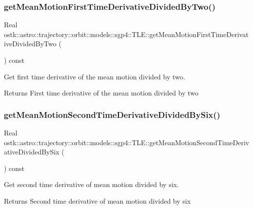 \subsubsection{\texorpdfstring{get\+Mean\+Motion\+First\+Time\+Derivative\+Divided\+By\+Two()}{getMeanMotionFirstTimeDerivativeDividedByTwo()}}
{\footnotesize\ttfamily Real ostk\+::astro\+::trajectory\+::orbit\+::models\+::sgp4\+::\+T\+L\+E\+::get\+Mean\+Motion\+First\+Time\+Derivative\+Divided\+By\+Two (\begin{DoxyParamCaption}{ }\end{DoxyParamCaption}) const}



Get first time derivative of the mean motion divided by two. 

\begin{DoxyReturn}{Returns}
First time derivative of the mean motion divided by two 
\end{DoxyReturn}
\mbox{\label{classostk_1_1astro_1_1trajectory_1_1orbit_1_1models_1_1sgp4_1_1_t_l_e_a7115d973dfff075411e114542bec8eeb}} 
\subsubsection{\texorpdfstring{get\+Mean\+Motion\+Second\+Time\+Derivative\+Divided\+By\+Six()}{getMeanMotionSecondTimeDerivativeDividedBySix()}}
{\footnotesize\ttfamily Real ostk\+::astro\+::trajectory\+::orbit\+::models\+::sgp4\+::\+T\+L\+E\+::get\+Mean\+Motion\+Second\+Time\+Derivative\+Divided\+By\+Six (\begin{DoxyParamCaption}{ }\end{DoxyParamCaption}) const}



Get second time derivative of mean motion divided by six. 

\begin{DoxyReturn}{Returns}
Second time derivative of mean motion divided by six 
\end{DoxyReturn}
\mbox{\label{classostk_1_1astro_1_1trajectory_1_1orbit_1_1models_1_1sgp4_1_1_t_l_e_af8a8a71621c85e1a0eaf4a18fc3f25e4}} 
